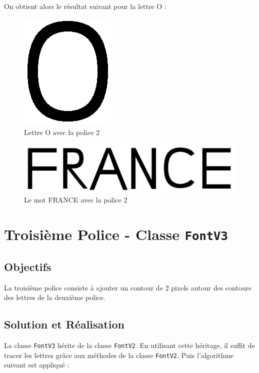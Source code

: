 \documentclass[a4paper, 12pt]{article}
\begin{document}
On obtient alors le résultat suivant pour la lettre O : 

\begin{figure}[h]
\centering
\includegraphics[scale=0.9]{Images/FontV2_O.png}
\caption{Lettre O avec la police 2}
\label{fig5}
\end{figure}

\begin{figure}[h]
\centering
\includegraphics[scale=0.5]{Images/FRANCE_FontV2.jpeg}
\caption{Le mot FRANCE avec la police 2}
\label{fig6}
\end{figure}

\newpage
\section{Troisième Police - Classe \texttt{FontV3}}		
\subsection{Objectifs}
La troisième police consiste à ajouter un contour de 2 pixels autour des contours des lettres de la deuxième police. 

\subsection{Solution et Réalisation}
La classe \texttt{FontV3} hérite de la classe \texttt{FontV2}. En utilisant cette héritage, il suffit de tracer les lettres grâce aux méthodes de la classe \texttt{FontV2}. Puis l'algorithme suivant est appliqué :   
\end{document}
